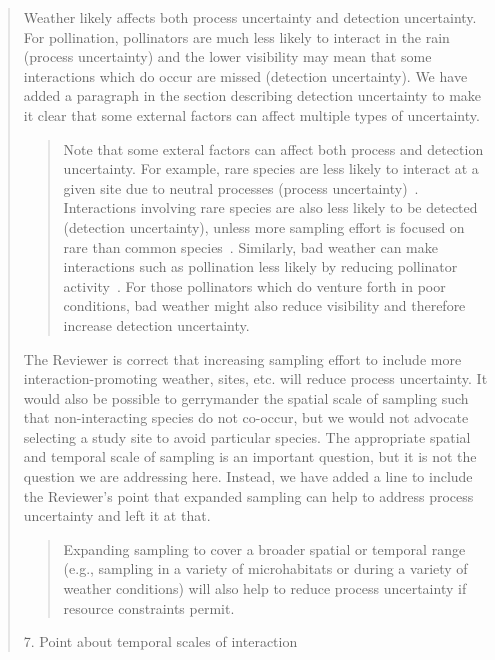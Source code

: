 \documentclass[12pt]{letter}
\begin{document}
\begin{quotation}
	Weather likely affects both process uncertainty and detection uncertainty. For pollination, pollinators are much less likely to interact in the rain (process uncertainty) and the lower visibility may mean that some interactions which do occur are missed (detection uncertainty). We have added a paragraph in the section describing detection uncertainty to make it clear that some external factors can affect multiple types of uncertainty. 

		\begin{quotation}

			Note that some exteral factors can affect both process and detection uncertainty. For example, rare species are less likely to interact at a given site due to neutral processes (process uncertainty)~\citep{}. Interactions involving rare species are also less likely to be detected (detection uncertainty), unless more sampling effort is focused on rare than common species~\citep{}. Similarly, bad weather can make interactions such as pollination less likely by reducing pollinator activity~\citep{}. For those pollinators which do venture forth in poor conditions, bad weather might also reduce visibility and therefore increase detection uncertainty.	

		\end{quotation}

	The Reviewer is correct that increasing sampling effort to include more interaction-promoting weather, sites, etc. will reduce process uncertainty. It would also be possible to gerrymander the spatial scale of sampling such that non-interacting species do not co-occur, but we would not advocate selecting a study site to avoid particular species. The appropriate spatial and temporal scale of sampling is an important question, but it is not the question we are addressing here. Instead, we have added a line to include the Reviewer's point that expanded sampling can help to address process uncertainty and left it at that.

		\begin{quotation}

		Expanding sampling to cover a broader spatial or temporal range (e.g., sampling in a variety of microhabitats or during a variety of weather conditions) will also help to reduce process uncertainty if resource constraints permit.

		\end{quotation}


	7. Point about temporal scales of interaction


\end{quotation}
\end{document}
